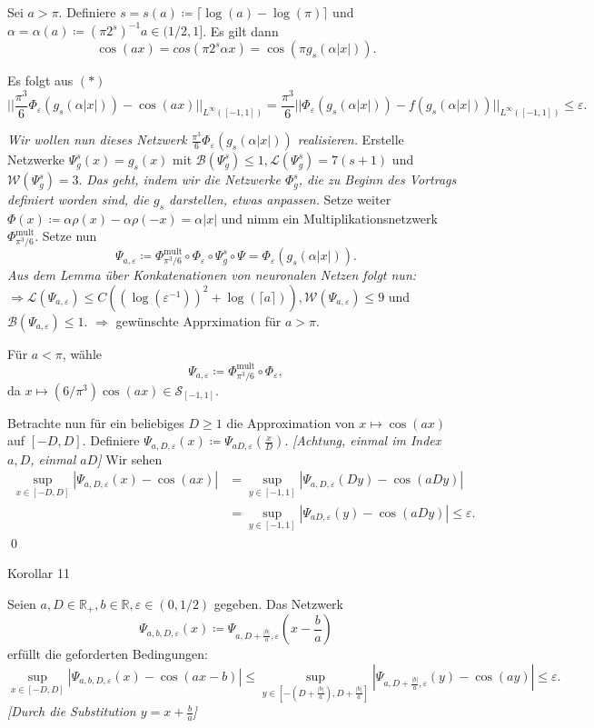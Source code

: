 \documentclass[12pt]{article}
\newcommand{\R}{\mathbb{R}} %
\begin{document}
Sei \(a > \pi\). Definiere \(s = s(a) \coloneqq \lceil \log(a) - \log(\pi) \rceil\) und \(\alpha = \alpha(a) \coloneqq (\pi 2^s)^{-1}a \in (1/2, 1]\). 
Es gilt dann 
\[ \cos(ax) = cos(\pi 2^s \alpha x) = \cos(\pi g_s(\alpha |x|)). \]

Es folgt aus \((*)\)
\[ || \frac{\pi^3}{6} \Phi_\varepsilon (g_s(\alpha |x|)) - \cos(ax) ||_{L^{\infty}([-1,1])} = \frac{\pi^3}{6} ||\Phi_\varepsilon (g_s(\alpha |x|)) - f(g_s(\alpha |x|))||_{L^\infty ([-1,1])} \leq \varepsilon. \]

\textit{Wir wollen nun dieses Netzwerk \(\frac{\pi^3}{6} \Phi_\varepsilon (g_s(\alpha |x|))\) realisieren.}
Erstelle Netzwerke \(\Psi_g^s(x) = g_s(x)\) mit \(\mathcal{B}(\Psi_g^s) \leq 1, \mathcal{L}(\Psi_g^s ) = 7(s+1)\) und \(\mathcal{W}(\Psi_g^s) = 3\).
\textit{Das geht, indem wir die Netzwerke \(\Phi_g^s\), die zu Beginn des Vortrags definiert worden sind, die \(g_s\) darstellen, etwas anpassen.}
Setze weiter \(\Phi(x) \coloneqq \alpha \rho(x) - \alpha \rho(-x) = \alpha |x|\) 
und nimm ein Multiplikationsnetzwerk \(\Phi_{\pi^3/6}^{\text{mult}}\). Setze nun 
\[ \Psi_{a,\varepsilon} \coloneqq \Phi_{\pi^3/6}^{\text{mult}} \circ \Phi_\varepsilon \circ \Psi_g^s \circ \Psi = \Phi_\varepsilon(g_s(\alpha |x|)). \]
\textit{Aus dem Lemma über Konkatenationen von neuronalen Netzen folgt nun:}
\(\Rightarrow \mathcal{L}(\Psi_{a,\varepsilon}) \leq C ((\log(\varepsilon^{-1}))^2 + \log(\lceil a \rceil) ), \mathcal{W}(\Psi_{a,\varepsilon}) \leq 9\) 
und \( \mathcal{B}(\Psi_{a,\varepsilon}) \leq 1 \). 
\(\Rightarrow\) gewünschte Apprximation für \(a > \pi\).

Für \(a < \pi\), wähle 
\[ \Psi_{a,\varepsilon} \coloneqq \Phi_{\pi^3/6}^{\text{mult}} \circ \Phi_\varepsilon,  \]
da \(x\mapsto (6/\pi^3) \cos(ax) \in \mathcal{S}_{[-1,1]}\).

Betrachte nun für ein beliebiges \(D\geq 1\) die Approximation von \(x \mapsto \cos(ax)\) auf \([-D,D]\). 
Definiere \(\Psi_{a,D,\varepsilon}(x) \coloneqq \Psi_{aD,\varepsilon}(\frac{x}{D})\). \textit{[Achtung, einmal im Index \(a,D\), einmal \(aD\)]} Wir sehen 
\begin{align*}
    \sup_{x\in [-D,D]} |\Psi_{a,D,\varepsilon}(x) - \cos(ax)| &= \sup_{y\in [-1,1]} |\Psi_{a,D,\varepsilon} (Dy) - \cos(aDy) | \\
    &= \sup_{y\in [-1,1]} |\Psi_{aD,\varepsilon}(y) - \cos(aDy)| \leq \varepsilon. 
\end{align*}\qed

\newpage

{\Large Korollar 11} %

Seien \(a,D\in \R_+, b\in \R, \varepsilon \in (0, 1/2)\) gegeben. 
Das Netzwerk 
\[ \Psi_{a,b,D,\varepsilon}(x) \coloneqq \Psi_{a, D + \frac{|b|}{a}, \varepsilon}(x - \frac{b}{a}) \]
erfüllt die geforderten Bedingungen: 
\[ \sup_{x\in [-D,D]} |\Psi_{a,b,D,\varepsilon}(x) - \cos(ax-b) | \leq \sup_{y \in [-(D+\frac{|b|}{a}), D+ \frac{|b|}{a}]} |\Psi_{a,D+\frac{|b|}{a},\varepsilon}(y) - \cos(ay)| \leq \varepsilon. \]
\textit{[Durch die Substitution \(y = x + \frac{b}{a}\)]}
\end{document}

